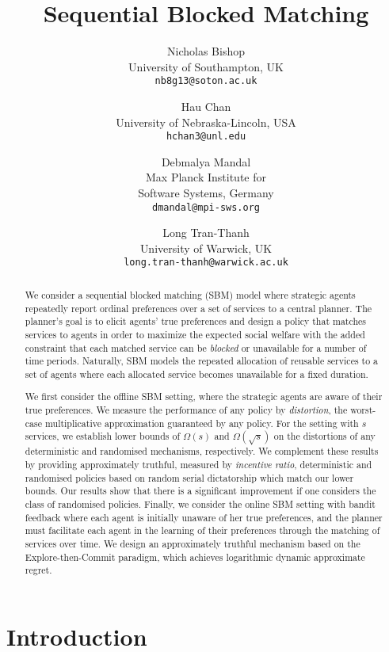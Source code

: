 \documentclass[letterpaper,11pt]{article}
\title{Sequential Blocked Matching}
\author{%
   Nicholas Bishop \\
  University of Southampton, UK\\
  \texttt{nb8g13@soton.ac.uk} 
  \and
  Hau Chan \\
  University of Nebraska-Lincoln, USA\\
  \texttt{hchan3@unl.edu} 
  \and
  Debmalya Mandal \\
  Max Planck Institute for \\Software Systems, Germany\\
  \texttt{dmandal@mpi-sws.org} 
  \and
  Long Tran-Thanh \\
  University of Warwick, UK\\
  \texttt{long.tran-thanh@warwick.ac.uk} \\
}
\newcommand{\kibitz}[2]{\ifnum\Comments=1{\color{#1}{#2}}\fi}
\newcommand{\hau}[1]{\kibitz{blue}{[Hau: #1]}}
\begin{document}
\maketitle

\begin{abstract}
  We consider a sequential blocked matching (SBM) model 
  where strategic agents repeatedly report ordinal preferences over a set of services to a central planner. 
  The planner's goal is to elicit agents' true preferences and design a policy that matches services to agents in order to maximize the expected social welfare with the added constraint that 
  each matched service can be \emph{blocked} or unavailable for a number of time periods. 
  Naturally, SBM models the repeated allocation of reusable services to a set of agents where each allocated service becomes unavailable for a fixed duration. 

  We first consider the offline SBM setting, where the strategic agents are aware of their true preferences.  
  We measure the performance of any policy by \emph{distortion}, the worst-case multiplicative approximation guaranteed by any policy.
  For the setting with $s$ services, we establish lower bounds of $\Omega(s)$ and $\Omega(\sqrt{s})$ on the distortions of any deterministic and randomised mechanisms, respectively. 
  We complement these results by providing approximately truthful, measured by \emph{incentive ratio}, deterministic and randomised policies based on random serial dictatorship which match our lower bounds. Our results show that there is a significant improvement if one considers the class of randomised policies. 
  Finally, we consider the online SBM setting with bandit feedback where each agent is initially unaware of her true preferences, and the planner must facilitate each agent in the learning of their preferences through the matching of services over time.
  We design an approximately truthful mechanism based on the Explore-then-Commit paradigm, which achieves logarithmic dynamic approximate regret.
\end{abstract}


\section{Introduction}
\end{document}
